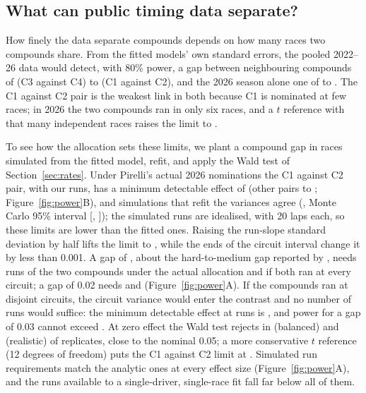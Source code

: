 \subsection{What can public timing data separate?}\label{sec:power}

How finely the data separate compounds depends on how many races two compounds share.
From the fitted models' own standard errors, the pooled 2022--26 data would detect, with 80\% power, a gap between neighbouring compounds of \PoolMDEFourThree\spl{} (C3 against C4) to \PoolMDETwoOne\spl{} (C1 against C2), and the 2026 season alone one of \SixMDEFourThree{} to \SixMDETwoOne\spl.
The C1 against C2 pair is the weakest link in both because C1 is nominated at few races; in 2026 the two compounds ran in only six races, and a $t$ reference with that many independent races raises the limit to \SixMDETTwoOne\spl.

To see how the allocation sets these limits, we plant a compound gap in races simulated from the fitted model, refit, and apply the Wald test of Section~\ref{sec:rates}.
Under Pirelli's actual 2026 nominations the C1 against C2 pair, with our \NRunsCOneCTwo{} runs, has a minimum detectable effect of \MDERealCOneCTwo\spl{} (other pairs \MDERealCThreeCFour{} to \MDERealCFourCFive\spl; Figure~\ref{fig:power}B), and simulations that refit the variances agree (\MDESimRealCOneCTwo\spl, Monte Carlo 95\% interval [\MDESimRealCOneCTwoLo, \MDESimRealCOneCTwoHi]); the simulated runs are idealised, with 20 laps each, so these limits are lower than the fitted ones.
Raising the run-slope standard deviation by half lifts the limit to \MDERealCOneCTwoStress\spl, while the ends of the circuit interval change it by less than 0.001\spl.
A gap of \PowerEffectSize\spl, about the hard-to-medium gap reported by \citet[Table~5]{cappelloHoegh2026}, needs \PXRunsRealSix{} runs of the two compounds under the actual allocation and \PXRunsBalSix{} if both ran at every circuit; a gap of 0.02\spl{} needs \PXRunsRealTwenty{} and \PXRunsBalTwenty{} (Figure~\ref{fig:power}A).
If the compounds ran at disjoint circuits, the circuit variance would enter the contrast and no number of runs would suffice: the minimum detectable effect at \NStintsBalanced{} runs is \MDESplit\spl, and power for a gap of 0.03\spl{} cannot exceed \PXSplitCeilThirty.
At zero effect the Wald test rejects in \PXSizeBal{} (balanced) and \PXSizeReal{} (realistic) of \PXSizeReps{} replicates, close to the nominal 0.05; a more conservative $t$ reference (12 degrees of freedom) puts the C1 against C2 limit at \MDESimRealCOneCTwoT\spl.
Simulated run requirements match the analytic ones at every effect size (Figure~\ref{fig:power}A), and the \PowerStintsCappello{} runs available to a single-driver, single-race fit fall far below all of them.

